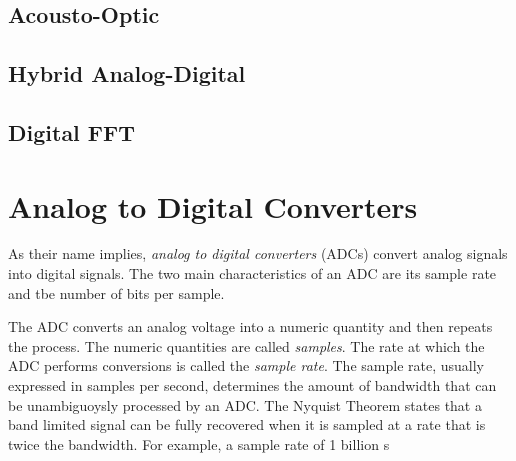 \documentclass{article}
\begin{document}
\subsection{Acousto-Optic}\label{acousto-optic}

\subsection{Hybrid Analog-Digital}\label{hybrid-analog-digital}

\subsection{Digital FFT}\label{digital-fft}

\section{Analog to Digital
Converters}\label{analog-to-digital-converters}

As their name implies, \emph{analog to digital converters} (ADCs)
convert analog signals into digital signals. The two main
characteristics of an ADC are its sample rate and tbe number of bits per
sample.

The ADC converts an analog voltage into a numeric quantity and then
repeats the process. The numeric quantities are called \emph{samples}.
The rate at which the ADC performs conversions is called the
\emph{sample rate}. The sample rate, usually expressed in samples per
second, determines the amount of bandwidth that can be unambiguoysly
processed by an ADC. The Nyquist Theorem states that a band limited
signal can be fully recovered when it is sampled at a rate that is twice
the bandwidth. For example, a sample rate of 1 billion s











\end{document}
